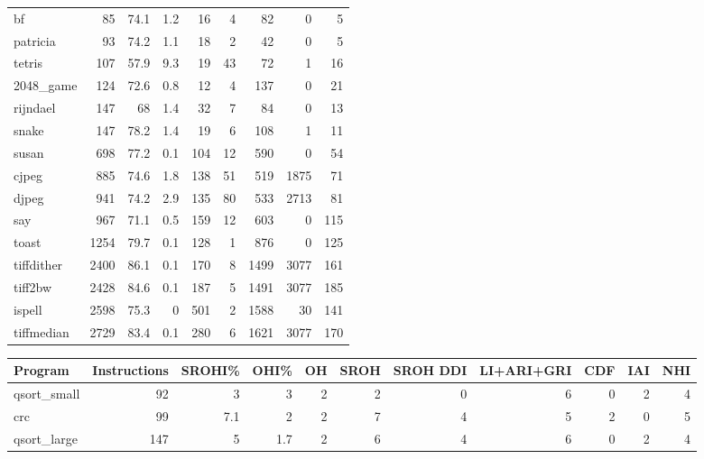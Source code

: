 \begin{tabular}{lrrrrrrrr}
 bf              &       85 &     74.1 &    1.2 &   16 &    4 &     82 &     0 &     5 \\
 patricia        &       93 &     74.2 &    1.1 &   18 &    2 &     42 &     0 &     5 \\
 tetris          &      107 &     57.9 &    9.3 &   19 &   43 &     72 &     1 &    16 \\
 2048\_game       &      124 &     72.6 &    0.8 &   12 &    4 &    137 &     0 &    21 \\
 rijndael        &      147 &     68   &    1.4 &   32 &    7 &     84 &     0 &    13 \\
 snake           &      147 &     78.2 &    1.4 &   19 &    6 &    108 &     1 &    11 \\
 susan           &      698 &     77.2 &    0.1 &  104 &   12 &    590 &     0 &    54 \\
 cjpeg           &      885 &     74.6 &    1.8 &  138 &   51 &    519 &  1875 &    71 \\
 djpeg           &      941 &     74.2 &    2.9 &  135 &   80 &    533 &  2713 &    81 \\
 say             &      967 &     71.1 &    0.5 &  159 &   12 &    603 &     0 &   115 \\
 toast           &     1254 &     79.7 &    0.1 &  128 &    1 &    876 &     0 &   125 \\
 tiffdither      &     2400 &     86.1 &    0.1 &  170 &    8 &   1499 &  3077 &   161 \\
 tiff2bw         &     2428 &     84.6 &    0.1 &  187 &    5 &   1491 &  3077 &   185 \\
 ispell          &     2598 &     75.3 &    0   &  501 &    2 &   1588 &    30 &   141 \\
 tiffmedian      &     2729 &     83.4 &    0.1 &  280 &    6 &   1621 &  3077 &   170 \\
\hline
\end{tabular}\begin{tabular}{lrrrrrrrrrr}
\hline
 Program         &   Instructions &   SROHI\% &   OHI\% &   OH &   SROH &   SROH DDI &   LI+ARI+GRI &   CDF &   IAI &   NHI \\
\hline
 qsort\_small     &             92 &      3   &    3   &    2 &      2 &          0 &            6 &     0 &     2 &     4 \\
 crc             &             99 &      7.1 &    2   &    2 &      7 &          4 &            5 &     2 &     0 &     5 \\
 qsort\_large     &            147 &      5   &    1.7 &    2 &      6 &          4 &            6 &     0 &     2 &     4 \\

\end{tabular}
